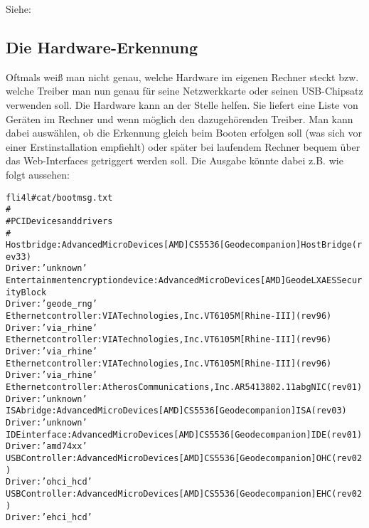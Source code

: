 \begin{description}
    Siehe:


\end{description}

\subsection{Die Hardware-Erkennung}

Oftmals weiß man nicht genau, welche Hardware im eigenen Rechner
steckt bzw. welche Treiber man nun genau für seine Netzwerkkarte oder
seinen USB-Chipsatz verwenden soll. Die Hardware kann an der Stelle
helfen. Sie liefert eine Liste von Geräten im Rechner und wenn möglich
den dazugehörenden Treiber. Man kann dabei auswählen, ob die Erkennung
gleich beim Booten erfolgen soll (was sich vor einer Erstinstallation
empfiehlt) oder später bei laufendem Rechner bequem über das
Web-Interfaces getriggert werden soll. Die Ausgabe könnte dabei
z.B. wie folgt aussehen:

\begin{example}
\begin{alltt}
fli4l \version # cat /bootmsg.txt
#
# PCI Devices and drivers
#
Host bridge: Advanced Micro Devices [AMD] CS5536 [Geode companion] Host Bridge (rev 33)
Driver: 'unknown'
Entertainment encryption device: Advanced Micro Devices [AMD] Geode LX AES Security Block
Driver: 'geode_rng'
Ethernet controller: VIA Technologies, Inc. VT6105M [Rhine-III] (rev 96)
Driver: 'via_rhine'
Ethernet controller: VIA Technologies, Inc. VT6105M [Rhine-III] (rev 96)
Driver: 'via_rhine'
Ethernet controller: VIA Technologies, Inc. VT6105M [Rhine-III] (rev 96)
Driver: 'via_rhine'
Ethernet controller: Atheros Communications, Inc. AR5413 802.11abg NIC (rev 01)
Driver: 'unknown'
ISA bridge: Advanced Micro Devices [AMD] CS5536 [Geode companion] ISA (rev 03)
Driver: 'unknown'
IDE interface: Advanced Micro Devices [AMD] CS5536 [Geode companion] IDE (rev 01)
Driver: 'amd74xx'
USB Controller: Advanced Micro Devices [AMD] CS5536 [Geode companion] OHC (rev 02)
Driver: 'ohci_hcd'
USB Controller: Advanced Micro Devices [AMD] CS5536 [Geode companion] EHC (rev 02)
Driver: 'ehci_hcd'
\end{alltt}
\end{example}


